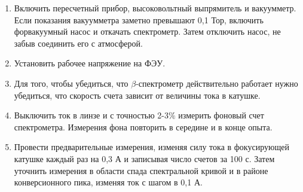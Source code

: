 \documentclass[a4paper, 12pt]{article}%
\newcommand{\be}{\ensuremath{\beta}}
\begin{document}
\begin{enumerate}
\item Включить пересчетный прибор, высоковольтный выпрямитель и вакуумметр. Если показания вакуумметра заметно превышают 0,1 Тор, включить форвакуумный насос и откачать спектрометр. Затем отключить насос, не забыв соединить его с атмосферой.

\item Установить рабочее напряжение на ФЭУ.

\item Для того, чтобы убедиться, что \be-спектрометр действительно работает нужно убедиться, что скорость счета зависит от величины тока в катушке.

\item Выключить ток в линзе и с точностью 2-3$\%$ измерить фоновый счет спектрометра. Измерения фона повторить в середине и в конце опыта.

\item Провести предварительные измерения, изменяя силу тока в фокусирующей катушке каждый раз на 0,3 А и записывая число счетов за 100 с. Затем уточнить измерения в области спада спектральной кривой и в районе конверсионного пика, изменяя ток с шагом в 0,1 А.
\end{enumerate}
\end{document}
